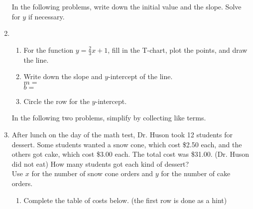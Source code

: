 \documentclass[12pt, oneside]{article}
\begin{document}
\begin{enumerate}
\newpage

In the following problems, write down the initial value and the slope. Solve for $y$ if necessary.

\newpage

\item
\begin{enumerate}
  \item For the function $y= \frac{2}{3}x+1$, fill in the T-chart, plot the points, and draw the line.
    \begin{center} %
    \end{center}
    \item Write down the slope and $y$-intercept of the line.\\[0.5cm]
    $m=$\\[0.5cm]
    $b=$\\[0.5cm]
    \item Circle the row for the $y$-intercept.
\end{enumerate}
\vspace{1cm}

In the following two problems, simplify by collecting like terms.

\newpage

  \item After lunch on the day of the math test, Dr. Huson took 12 students for dessert. Some students wanted a snow cone, which cost \$2.50 each, and the others got cake, which cost \$3.00 each. The total cost was \$31.00. (Dr. Huson did not eat) How many students got each kind of dessert? \\[0.5cm]
  Use $x$ for the number of snow cone orders and $y$ for the number of cake orders.
  \begin{enumerate}
    \item Complete the table of costs below. (the first row is done as a hint)


\end{enumerate}
\end{enumerate}
\end{document}
